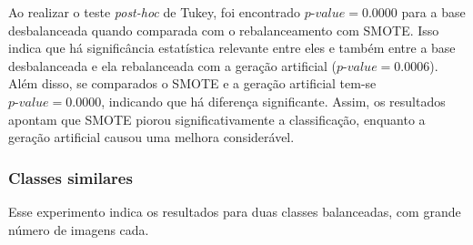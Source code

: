 

Ao realizar o teste \textit{post-hoc} de Tukey, foi encontrado $\textit{p-value} = 0.0000$ para a base desbalanceada quando comparada com o rebalanceamento com SMOTE. Isso indica que há significância estatística relevante entre eles e também entre a base desbalanceada e ela rebalanceada com a geração artificial ($\textit{p-value} = 0.0006$). Além disso, se comparados o SMOTE e a geração artificial tem-se $\textit{p-value} = 0.0000$, indicando que há diferença significante. Assim, os resultados apontam que SMOTE piorou significativamente a classificação, enquanto a geração artificial causou uma melhora considerável.

\subsubsection{Classes similares}
Esse experimento indica os resultados para duas classes balanceadas, com grande número de imagens cada.


